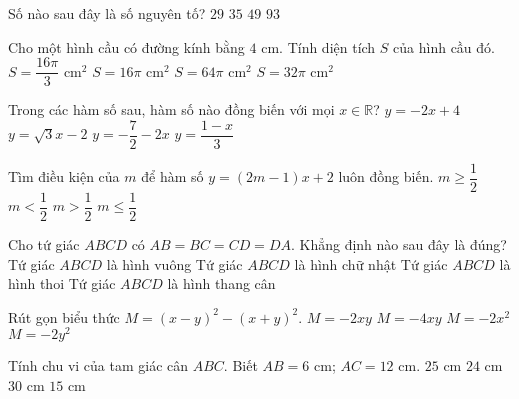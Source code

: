 \begin{ex}%
	 Số nào sau đây là số nguyên tố?
	\choice
	{\True $29$}
	{$35$}
	{$49$}
	{$93$}
\end{ex}
\begin{ex}%
Cho một hình cầu có đường kính bằng $4$ cm. Tính diện tích $S$ của hình cầu đó.
\choice
{$S=\dfrac{16\pi}{3}$ cm$^2$}
{\True $S=16\pi$ cm$^2$}
{$S=64\pi$ cm$^2$}
{$S=32\pi$ cm$^2$ }
\end{ex}
\begin{ex}%
Trong các hàm số sau, hàm số nào đồng biến với mọi $x\in\mathbb{R}$?	
	\choice
	{$y=-2x+4$}
	{\True $y=\sqrt{3}x-2$}
	{$y=-\dfrac{7}{2}-2x$}
	{$y=\dfrac{1-x}{3}$}
\end{ex}
\begin{ex}%
	Tìm điều kiện của $m$ để hàm số $y=(2m-1)x+2$ luôn đồng biến.
	\choice
	{$m\geq \dfrac{1}{2}$}
	{\True $m<\dfrac{1}{2}$}
	{$m>\dfrac{1}{2}$}
	{$m\leq \dfrac{1}{2}$}
\end{ex}
\begin{ex}%
	Cho tứ giác $ABCD$ có $AB=BC=CD=DA$. Khẳng định nào sau đây là đúng?
	\choice
	{Tứ giác $ABCD$ là hình vuông}
	{Tứ giác $ABCD$ là hình chữ nhật}
	{\True Tứ giác $ABCD$ là hình thoi}
	{Tứ giác $ABCD$ là hình thang cân}
\end{ex}
\begin{ex}%
	Rút gọn biểu thức $M=(x-y)^2-(x+y)^2$.
	\choice
	{$M=-2xy$}
	{\True $M=-4xy$}
	{$M=-2x^2$}
	{$M=-2y^2$}
\end{ex}
\begin{ex}%
	Tính chu vi của tam giác cân $ABC$. Biết $AB=6$ cm; $AC=12$ cm.
	\choice
	{$25$ cm}
	{$24$ cm}
	{\True $30$ cm}
	{$15$ cm}
\end{ex}
